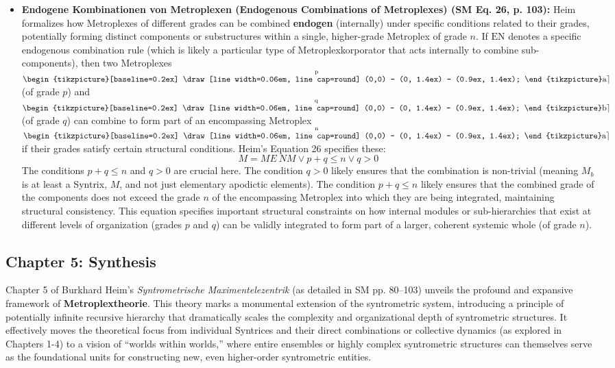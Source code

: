 \documentclass[12pt]{article}
\newcommand{\q}[1]{\enquote{#1}}
\newcommand{\korporatorkette}{\mathord{\text{%
  \begin{tikzpicture}[baseline=0.2ex]
    \draw[line width=0.06em, line cap=round] 
         (0,0) -- (0, 1.4ex) -- (0.9ex, 1.4ex);
  \end{tikzpicture}%
}}}
\def\metroplex#1#2{M}%
\begin{document}
\begin{itemize}
    \item \textbf{Endogene Kombinationen von Metroplexen (Endogenous Combinations of Metroplexes) (SM Eq. 26, p. 103):}
    Heim formalizes how Metroplexes of different grades can be combined \textbf{endogen} (internally) under specific conditions related to their grades, potentially forming distinct components or substructures within a single, higher-grade Metroplex of grade \( n \). If \( \mathrm{EN} \) denotes a specific endogenous combination rule (which is likely a particular type of Metroplexkorporator that acts internally to combine sub-components), then two Metroplexes \( \overset{\mathrm{p}}{\korporatorkette\mathrm{a}\rceil} \) (of grade \( p \)) and \( \overset{\mathrm{q}}{\korporatorkette\mathrm{b}\rceil} \) (of grade \( q \)) can combine to form part of an encompassing Metroplex \( \overset{\mathrm{n}}{\korporatorkette\mathrm{a}\rceil} \) if their grades satisfy certain structural conditions. Heim's Equation 26 specifies these:
    \begin{equation}
    \metroplex{\tilde{n}}{a} = \metroplex{n}{a} E \ N \metroplex{p+q}{b} \lor p+q \le n \lor q > 0
    \label{eq:original_endogene_kombination} \tag{26}
    \end{equation}
    The conditions \( p+q \leq n \) and \( q > 0 \) are crucial here. The condition \( q > 0 \) likely ensures that the combination is non-trivial (meaning \( \metroplex{q}{}_b \) is at least a Syntrix, \( \metroplex{0}{} \), and not just elementary apodictic elements). The condition \( p+q \leq n \) likely ensures that the combined grade of the components does not exceed the grade \( n \) of the encompassing Metroplex into which they are being integrated, maintaining structural consistency. This equation specifies important structural constraints on how internal modules or sub-hierarchies that exist at different levels of organization (grades \( p \) and \( q \)) can be validly integrated to form part of a larger, coherent systemic whole (of grade \( n \)).
\end{itemize}

\subsection{Chapter 5: Synthesis}
\label{sec:chapter5_synthesis}

Chapter 5 of Burkhard Heim's \textit{Syntrometrische Maximentelezentrik} (as detailed in SM pp. 80–103) unveils the profound and expansive framework of \textbf{Metroplextheorie}. This theory marks a monumental extension of the syntrometric system, introducing a principle of potentially infinite recursive hierarchy that dramatically scales the complexity and organizational depth of syntrometric structures. It effectively moves the theoretical focus from individual Syntrices and their direct combinations or collective dynamics (as explored in Chapters 1-4) to a vision of \q{worlds within worlds,} where entire ensembles or highly complex syntrometric structures can themselves serve as the foundational units for constructing new, even higher-order syntrometric entities.
\end{document}
